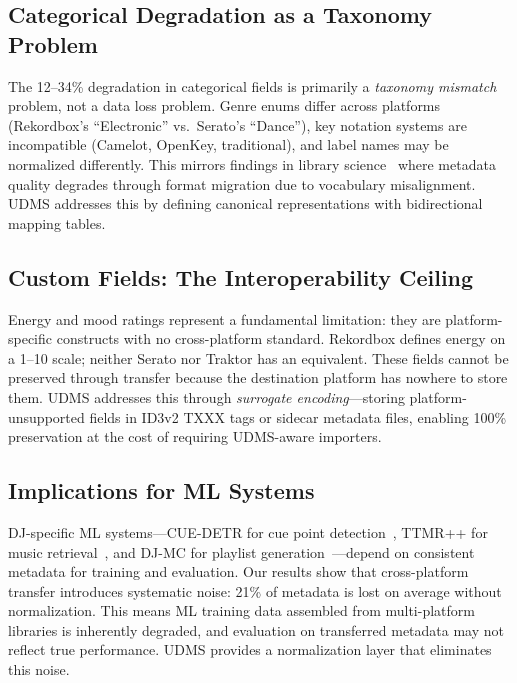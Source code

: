 \subsection{Categorical Degradation as a Taxonomy Problem}

The 12--34\% degradation in categorical fields is primarily a \emph{taxonomy mismatch} problem, not a data loss problem. Genre enums differ across platforms (Rekordbox's ``Electronic'' vs.\ Serato's ``Dance''), key notation systems are incompatible (Camelot, OpenKey, traditional), and label names may be normalized differently. This mirrors findings in library science~\citep{ribov2022} where metadata quality degrades through format migration due to vocabulary misalignment. UDMS addresses this by defining canonical representations with bidirectional mapping tables.

\subsection{Custom Fields: The Interoperability Ceiling}

Energy and mood ratings represent a fundamental limitation: they are platform-specific constructs with no cross-platform standard. Rekordbox defines energy on a 1--10 scale; neither Serato nor Traktor has an equivalent. These fields cannot be preserved through transfer because the destination platform has nowhere to store them. UDMS addresses this through \emph{surrogate encoding}---storing platform-unsupported fields in ID3v2 TXXX tags or sidecar metadata files, enabling 100\% preservation at the cost of requiring UDMS-aware importers.

\subsection{Implications for ML Systems}

DJ-specific ML systems---CUE-DETR for cue point detection~\citep{arguello2024cuedetr}, TTMR++ for music retrieval~\citep{ttmr2024}, and DJ-MC for playlist generation~\citep{liebman2015djmc}---depend on consistent metadata for training and evaluation. Our results show that cross-platform transfer introduces systematic noise: 21\% of metadata is lost on average without normalization. This means ML training data assembled from multi-platform libraries is inherently degraded, and evaluation on transferred metadata may not reflect true performance. UDMS provides a normalization layer that eliminates this noise.

